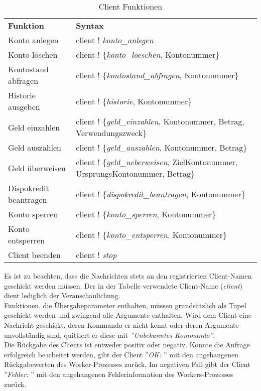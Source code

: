 \begin{table}[H]
\caption{Client Funktionen}
\begin{center}
\begin{tabular}[t]{l|l}
\textbf{Funktion} 	& \textbf{Syntax} \\
Konto anlegen 			& client ! \textit{konto\_anlegen}\\
Konto löschen 			& client ! \{\textit{konto\_loeschen}, Kontonummer\}\\
Kontostand abfragen 	& client ! \{\textit{kontostand\_abfragen}, Kontonummer\}\\
Historie ausgeben 		& client ! \{\textit{historie}, Kontonummer\}\\
Geld einzahlen			& client ! \{\textit{geld\_einzahlen}, Kontonummer, Betrag, Verwendungszweck\}\\
Geld auszahlen 			& client ! \{\textit{geld\_auszahlen}, Kontonummer, Betrag\}\\
Geld überweisen 		& client ! \{\textit{geld\_ueberweisen}, ZielKontonummer, UrsprungsKontonummer, Betrag\}\\
Dispokredit beantragen 	& client ! \{\textit{dispokredit\_beantragen}, Kontonummer\}\\
Konto sperren 			& client ! \{\textit{konto\_sperren}, Kontonummer\}\\
Konto entsperren 		& client ! \{\textit{konto\_entsperren}, Kontonummer\}\\
Client beenden 			& client ! \textit{stop}
\end{tabular}
\end{center}
\end{table}
$\;$ \\
Es ist zu beachten, dass die Nachrichten stets an den registrierten Client-Namen geschickt werden müssen. Der in der Tabelle verwendete Client-Name (\textit{client}) dient lediglich der Veranschaulichung.\\
Funktionen, die Übergabeparameter enthalten, müssen grundsätzlich als Tupel geschickt werden und zwingend alle Argumente enthalten. Wird dem Client eine Nachricht geschickt, deren Kommando er nicht kennt oder deren Argumente unvollständig sind, quittiert er diese mit \textit{''Unbekanntes Kommando''}.\\
Die Rückgabe des Clients ist entweder positiv oder negativ. Konnte die Anfrage erfolgreich bearbeitet werden, gibt der Client ''\textit{OK: }'' mit den angehangenen Rückgabewerten des Worker-Prozesses zurück. Im negativen Fall gibt der Client ''\textit{Fehler: }'' mit den angehangenen Fehlerinformation des Workers-Prozesses zurück.\\
